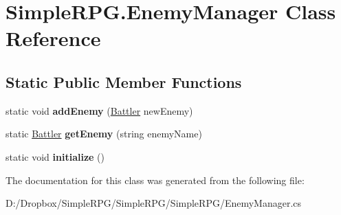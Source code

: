 \hypertarget{class_simple_r_p_g_1_1_enemy_manager}{\section{Simple\+R\+P\+G.\+Enemy\+Manager Class Reference}
\label{class_simple_r_p_g_1_1_enemy_manager}
}
\subsection*{Static Public Member Functions}
\begin{DoxyCompactItemize}
\item 
\hypertarget{class_simple_r_p_g_1_1_enemy_manager_a14baa62389dfdead6dfcee80e5011e11}{static void {\bfseries add\+Enemy} (\hyperlink{class_simple_r_p_g_1_1_battler}{Battler} new\+Enemy)}\label{class_simple_r_p_g_1_1_enemy_manager_a14baa62389dfdead6dfcee80e5011e11}

\item 
\hypertarget{class_simple_r_p_g_1_1_enemy_manager_a06f546f669c154cc8365b2bbeaca5f4f}{static \hyperlink{class_simple_r_p_g_1_1_battler}{Battler} {\bfseries get\+Enemy} (string enemy\+Name)}\label{class_simple_r_p_g_1_1_enemy_manager_a06f546f669c154cc8365b2bbeaca5f4f}

\item 
\hypertarget{class_simple_r_p_g_1_1_enemy_manager_a398c5141a704ce9c65606465dca71700}{static void {\bfseries initialize} ()}\label{class_simple_r_p_g_1_1_enemy_manager_a398c5141a704ce9c65606465dca71700}

\end{DoxyCompactItemize}


The documentation for this class was generated from the following file\+:\begin{DoxyCompactItemize}
\item 
D\+:/\+Dropbox/\+Simple\+R\+P\+G/\+Simple\+R\+P\+G/\+Simple\+R\+P\+G/Enemy\+Manager.\+cs\end{DoxyCompactItemize}
